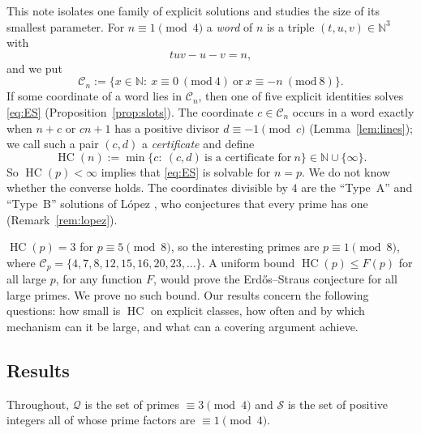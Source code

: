 \documentclass[11pt,reqno]{amsart}
\theoremstyle{definition}
\newcommand{\N}{\mathbb N}
\newcommand{\cC}{\mathcal C}
\newcommand{\cS}{\mathcal S}
\newcommand{\cQ}{\mathcal Q}
\newcommand{\HC}{\operatorname{HC}}
\begin{document}
This note isolates one family of explicit solutions and studies the size
of its smallest parameter.  For $n\equiv1\pmod4$ a \emph{word} of $n$ is a
triple $(t,u,v)\in\N^3$ with
\[
tuv-u-v=n,
\]
and we put
\[
\cC_n:=\{x\in\N:\ x\equiv0\ (\mathrm{mod}\ 4)\ \text{or}\ x\equiv-n\ (\mathrm{mod}\ 8)\}.
\]
If some coordinate of a word lies in $\cC_n$, then one of five explicit
identities solves \eqref{eq:ES} (Proposition~\ref{prop:slots}).  The
coordinate $c\in\cC_n$ occurs in a word exactly when $n+c$ or $cn+1$ has
a positive divisor $d\equiv-1\pmod c$ (Lemma~\ref{lem:lines}); we call
such a pair $(c,d)$ a \emph{certificate} and define
\[
\HC(n):=\min\{c:\ (c,d)\ \text{is a certificate for}\ n\}\in\N\cup\{\infty\}.
\]
So $\HC(p)<\infty$ implies that \eqref{eq:ES} is solvable for $n=p$.  We
do not know whether the converse holds.  The coordinates divisible by
$4$ are the ``Type~A'' and ``Type~B'' solutions of L\'opez \cite{Lopez},
who conjectures that every prime has one (Remark~\ref{rem:lopez}).

$\HC(p)=3$ for $p\equiv5\pmod 8$, so the interesting primes are
$p\equiv1\pmod 8$, where $\cC_p=\{4,7,8,12,15,16,20,23,\dots\}$.  A
uniform bound $\HC(p)\le F(p)$ for all large $p$, for any function $F$,
would prove the Erd\H{o}s--Straus conjecture for all large primes.  We
prove no such bound.  Our results concern the following questions: how
small is $\HC$ on explicit classes, how often and by which mechanism can
it be large, and what can a covering argument achieve.

\subsection*{Results}
Throughout, $\cQ$ is the set of primes $\equiv3\pmod4$ and $\cS$ is the
set of positive integers all of whose prime factors are $\equiv1\pmod4$.
\end{document}
